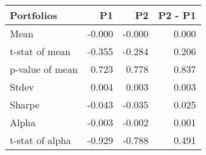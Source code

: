 \begin{tabular}{lrrr}
\toprule
Portfolios & P1 & P2 & P2 - P1 \\
\midrule
Mean & -0.000 & -0.000 & 0.000 \\
t-stat of mean & -0.355 & -0.284 & 0.206 \\
p-value of mean & 0.723 & 0.778 & 0.837 \\
Stdev & 0.004 & 0.003 & 0.003 \\
Sharpe & -0.043 & -0.035 & 0.025 \\
Alpha & -0.003 & -0.002 & 0.001 \\
t-stat of alpha & -0.929 & -0.788 & 0.491 \\
\bottomrule
\end{tabular}
